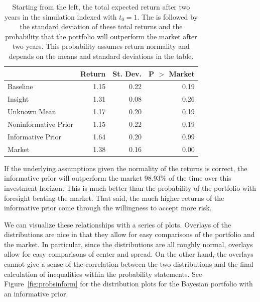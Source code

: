 \documentclass[a4paper]{article}\usepackage[]{graphicx}\usepackage[]{color}
\begin{document}
\begin{table}
    \centering
\begin{tabular}{lrrr}
  \hline
 & Return & St. Dev. & P $>$ Market \\ 
  \hline
Baseline & 1.15 & 0.22 & 0.19 \\ 
  Insight & 1.31 & 0.08 & 0.26 \\ 
  Unknown Mean & 1.17 & 0.20 & 0.19 \\ 
  Noninformative Prior & 1.15 & 0.22 & 0.19 \\ 
  Informative Prior & 1.64 & 0.20 & 0.99 \\ 
  Market & 1.38 & 0.16 & 0.00 \\ 
   \hline
\end{tabular}
    \caption{Starting from the left, the total expected return after two years in the simulation indexed with $t_0 = 1$. The is followed by the standard deviation of these total returns and the probability that the portfolio will outperform the market after two years. This probability assumes return normality and depends on the means and standard deviations in the table.}
    \label{tab:simulations}
\end{table}

If the underlying assumptions given the normality of the returns is correct, the informative prior will outperform the market 98.93\% of the time over this investment horizon. This is much better than the probability of the portfolio with foresight beating the market. That said, the much higher returns of the informative prior come through the willingness to accept more risk.

We can visualize these relationships with a series of plots. Overlays of the distributions are nice in that they allow for easy comparisons of the portfolio and the market. In particular, since the distributions are all roughly normal, overlays allow for easy comparisons of center and spread. On the other hand, the overlays cannot give a sense of the correlation between the two distributions and the final calculation of inequalities within the probability statements. See Figure~\ref{fig:probsinform} for the distribution plots for the Bayesian portfolio with an informative prior.
\end{document}
